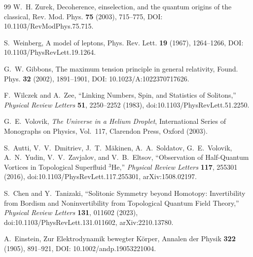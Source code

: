 \documentclass[11pt]{article}
\theoremstyle{definition}
\theoremstyle{plain}
\theoremstyle{remark}
\begin{document}
\begin{thebibliography}{99}
            W.~H. Zurek,
            \newblock Decoherence, einselection, and the quantum origins of the classical,
            \newblock Rev. Mod. Phys. \textbf{75} (2003), 715--775,
            \newblock DOI: 10.1103/RevModPhys.75.715.

            S.~Weinberg,
            \newblock A model of leptons,
            \newblock Phys. Rev. Lett. \textbf{19} (1967), 1264--1266,
            \newblock DOI: 10.1103/PhysRevLett.19.1264.

            G.~W. Gibbons,
            \newblock The maximum tension principle in general relativity,
            \newblock Found. Phys. \textbf{32} (2002), 1891--1901,
            \newblock DOI: 10.1023/A:1022370717626.

            F.~Wilczek and A.~Zee,
            \newblock ``Linking Numbers, Spin, and Statistics of Solitons,''
            \newblock \textit{Physical Review Letters} \textbf{51}, 2250--2252 (1983),
            \newblock doi:10.1103/PhysRevLett.51.2250.

            G.~E.~Volovik,
            \newblock \textit{The Universe in a Helium Droplet},
            \newblock International Series of Monographs on Physics, Vol.~117,
            \newblock Clarendon Press, Oxford (2003).

            S.~Autti, V.~V.~Dmitriev, J.~T.~M\"akinen, A.~A.~Soldatov,
            G.~E.~Volovik, A.~N.~Yudin, V.~V.~Zavjalov, and V.~B.~Eltsov,
            \newblock ``Observation of Half-Quantum Vortices in Topological Superfluid $^3$He,''
            \newblock \textit{Physical Review Letters} \textbf{117}, 255301 (2016),
            \newblock doi:10.1103/PhysRevLett.117.255301,
            \newblock arXiv:1508.02197.

            S.~Chen and Y.~Tanizaki,
            \newblock ``Solitonic Symmetry beyond Homotopy:
            Invertibility from Bordism and Noninvertibility from Topological Quantum Field Theory,''
            \newblock \textit{Physical Review Letters} \textbf{131}, 011602 (2023),
            \newblock doi:10.1103/PhysRevLett.131.011602,
            \newblock arXiv:2210.13780.

            A.~Einstein,
            \newblock Zur Elektrodynamik bewegter K{\"o}rper,
            \newblock Annalen der Physik \textbf{322} (1905), 891--921,
            \newblock DOI: 10.1002/andp.19053221004.


\end{thebibliography}
\end{document}

